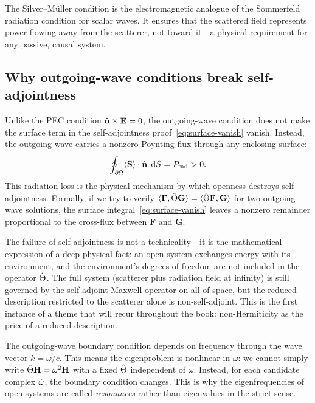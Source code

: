 The Silver--M\"uller condition is the electromagnetic analogue of the
Sommerfeld radiation condition for scalar waves. It ensures that the
scattered field represents power flowing away from the scatterer,
not toward it---a physical requirement for any passive, causal system.

\subsection{Why outgoing-wave conditions break self-adjointness}
\label{ssec:outgoing-breaks-sa}

Unlike the PEC condition $\hat{\mathbf{n}}\times\mathbf{E} = 0$, the outgoing-wave condition
does not make the surface term in the self-adjointness
proof~\eqref{eq:surface-vanish} vanish. Instead, the outgoing wave carries a
nonzero Poynting flux through any enclosing surface:
\begin{equation}
 \oint_{\partial\Omega}\langle\mathbf{S}\rangle\cdot\hat{\mathbf{n}}\;\mathop{}\!\mathrm{d} S
 = P_{\mathrm{rad}} > 0.
 \label{eq:radiated-power}
\end{equation}
This radiation loss is the physical mechanism by which openness destroys
self-adjointness. Formally, if we try to verify
$\langle\mathbf{F},\hat{\Theta}\mathbf{G}\rangle
= \langle\hat{\Theta}\mathbf{F},\mathbf{G}\rangle$ for two outgoing-wave
solutions, the surface integral~\eqref{eq:surface-vanish} leaves a nonzero
remainder proportional to the cross-flux between $\mathbf{F}$ and
$\mathbf{G}$.

The failure of self-adjointness is not a technicality---it is the
mathematical expression of a deep physical fact: an open system exchanges
energy with its environment, and the environment's degrees of freedom are
not included in the operator $\hat{\Theta}$. The full system (scatterer plus
radiation field at infinity) is still governed by the self-adjoint Maxwell
operator on all of space, but the reduced description restricted to
the scatterer alone is non-self-adjoint. This is the first instance of
a theme that will recur throughout the book: non-Hermiticity as the price
of a reduced description.

\begin{remark}
The outgoing-wave boundary condition depends on frequency through the
wave vector $k = \omega/c$. This means the eigenproblem is nonlinear in
$\omega$: we cannot simply write $\hat{\Theta}\mathbf{H} = \omega^2\mathbf{H}$ with a fixed
$\hat{\Theta}$ independent of $\omega$. Instead, for each candidate complex
$\tilde{\omega}$, the boundary condition changes. This is why the eigenfrequencies
of open systems are called \emph{resonances} rather than eigenvalues in the
strict sense.
\end{remark}


